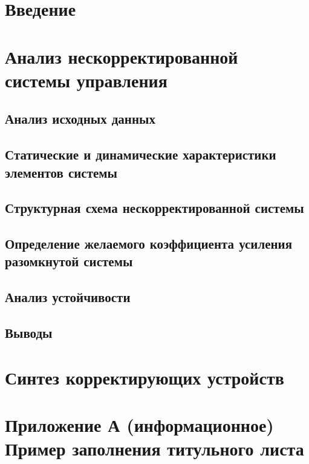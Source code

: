 \section*{Введение}
\section{Анализ нескорректированной системы управления}
\subsection{Анализ исходных данных} 
\subsection{Статические и динамические характеристики элементов системы} 
\subsection{Структурная схема нескорректированной системы} 
\subsection{Определение желаемого коэффициента усиления разомкнутой системы} 
\subsection{Анализ устойчивости} 
\subsection{Выводы} 
\section{Синтез корректирующих устройств}
\section*{Приложение А (информационное)  Пример заполнения титульного листа}

